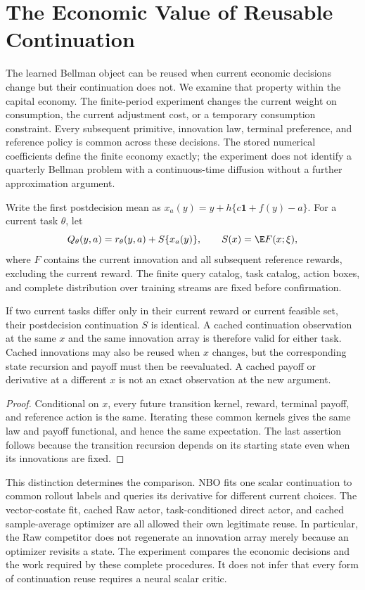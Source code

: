 \section{The Economic Value of Reusable Continuation}
\label{sec:r16menu}

The learned Bellman object can be reused when current economic decisions
change but their continuation does not. We examine that property within
the capital economy. The finite-period experiment changes the current
weight on consumption, the current adjustment cost, or a temporary
consumption constraint. Every subsequent primitive, innovation law,
terminal preference, and reference policy is common across these decisions.
The stored numerical coefficients define the finite economy exactly;
the experiment does not identify a quarterly Bellman problem with a
continuous-time diffusion without a further approximation argument.

Write the first postdecision mean as
$x_a(y)=y+h\{c\bm1+f(y)-a\}$. For a current task $\theta$, let
\[
 Q_\theta(y,a)=r_\theta(y,a)+S\{x_a(y)\},\qquad
 S(x)=\E F(x;\xi),
\]
where $F$ contains the current innovation and all subsequent reference
rewards, excluding the current reward. The finite query catalog, task
catalog, action boxes, and complete distribution over training streams
are fixed before confirmation.

\begin{proposition}
\label{prop:r16menucache}
If two current tasks differ only in their current reward or current
feasible set, their postdecision continuation $S$ is identical. A cached
continuation observation at the same $x$ and the same innovation array
is therefore valid for either task. Cached innovations may also be
reused when $x$ changes, but the corresponding state recursion and payoff
must then be reevaluated. A cached payoff or derivative at a different
$x$ is not an exact observation at the new argument.
\end{proposition}

\begin{proof}
Conditional on $x$, every future transition kernel, reward, terminal
payoff, and reference action is the same. Iterating these common kernels
gives the same law and payoff functional, and hence the same expectation.
The last assertion follows because the transition recursion depends on
its starting state even when its innovations are fixed.
\end{proof}

This distinction determines the comparison. NBO fits one scalar
continuation to common rollout labels and queries its derivative for
different current choices. The vector-costate fit, cached Raw actor,
task-conditioned direct actor, and cached sample-average optimizer are
all allowed their own legitimate reuse. In particular, the Raw competitor
does not regenerate an innovation array merely because an optimizer
revisits a state. The experiment compares the economic decisions and the
work required by these complete procedures. It does not infer that every
form of continuation reuse requires a neural scalar critic.


